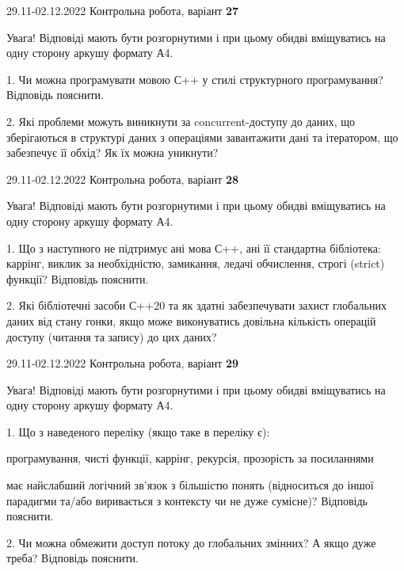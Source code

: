 \documentclass[11pt, ukrainian]{article}
\begin{document}
\vspace{4mm}



{29.11-02.12.2022 Контрольна робота, варіант  \No \textbf { 27 }\par}
Увага! Відповіді мають бути розгорнутими і при цьому обидві вміщуватись на одну сторону аркушу формату А4.

{
\begin {large}

1. Чи можна програмувати мовою С++ у стилі структурного програмування? Відповідь пояснити.%

2. Які проблеми можуть виникнути за concurrent-доступу до даних, що зберігаються в структурі даних з операціями завантажити дані та ітератором, що забезпечує її обхід? Як їх можна уникнути?

\end {large}}

\vspace{4mm}



{29.11-02.12.2022 Контрольна робота, варіант  \No \textbf { 28 }\par}
Увага! Відповіді мають бути розгорнутими і при цьому обидві вміщуватись на одну сторону аркушу формату А4.

{
\begin {large}

1. Що з наступного не підтримує ані мова С++, ані її стандартна бібліотека: каррінг, виклик за необхідністю, замикання, ледачі обчислення, строгі (strict) функції? Відповідь пояснити.%

2. Які бібліотечні засоби С++20 та як здатні забезпечувати захист глобальних даних від стану гонки, якщо може виконуватись довільна кількість операцій доступу (читання та запису) до цих даних?

\end {large}}

\vspace{4mm}
\newpage
{29.11-02.12.2022 Контрольна робота, варіант  \No \textbf { 29 }\par}
Увага! Відповіді мають бути розгорнутими і при цьому обидві вміщуватись на одну сторону аркушу формату А4.

{
\begin {large}

1. Що з наведеного переліку (якщо таке в переліку є):

\vspace{4mm}
 програмування, чисті функції, каррінг, рекурсія, прозорість за посиланнями

\vspace{4mm}
має найслабший логічний зв’язок з більшістю понять (відноситься до іншої парадигми та/або виривається з контексту чи не дуже сумісне)? Відповідь пояснити.


2. Чи можна обмежити доступ потоку до глобальних змінних? А якщо дуже треба? Відповідь пояснити.

\end {large}}
\end{document}
